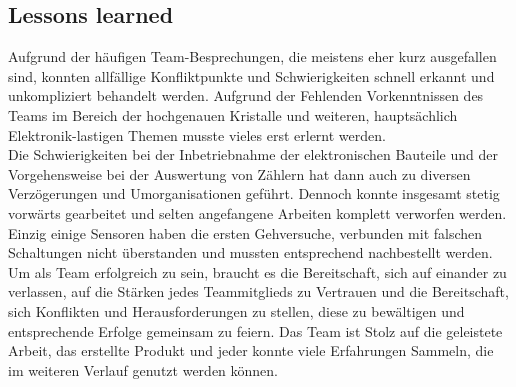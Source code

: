 \subsection{Lessons learned}
	Aufgrund der häufigen Team-Besprechungen, die meistens eher kurz ausgefallen sind, konnten allfällige Konfliktpunkte und Schwierigkeiten schnell erkannt und unkompliziert behandelt werden. Aufgrund der Fehlenden Vorkenntnissen des Teams im Bereich der hochgenauen Kristalle und weiteren, hauptsächlich Elektronik-lastigen Themen musste vieles erst erlernt werden.\\
	Die Schwierigkeiten bei der Inbetriebnahme der elektronischen Bauteile und der Vorgehensweise bei der Auswertung von Zählern hat dann auch zu diversen Verzögerungen und Umorganisationen geführt. Dennoch konnte insgesamt stetig vorwärts gearbeitet und selten angefangene Arbeiten komplett verworfen werden. Einzig einige Sensoren haben die ersten Gehversuche, verbunden mit falschen Schaltungen nicht überstanden und mussten entsprechend nachbestellt werden.\\
	Um als Team erfolgreich zu sein, braucht es die Bereitschaft, sich auf einander zu verlassen, auf die Stärken jedes Teammitglieds zu Vertrauen und die Bereitschaft, sich Konflikten und Herausforderungen zu stellen, diese zu bewältigen und entsprechende Erfolge gemeinsam zu feiern.
	Das Team ist Stolz auf die geleistete Arbeit, das erstellte Produkt und jeder konnte viele Erfahrungen Sammeln, die im weiteren Verlauf genutzt werden können.
		